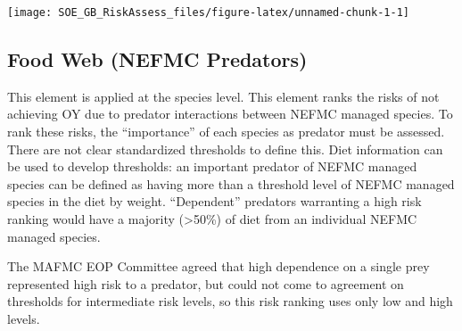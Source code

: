 \documentclass[11pt,]{article}
\let\origfigure\figure
\let\endorigfigure\endfigure
\renewenvironment{figure}[1][2] {
    \expandafter\origfigure\expandafter[H]
} {
    \endorigfigure
}
\begin{document}
\begin{figure}

{\centering \texttt{[image: SOE\_GB\_RiskAssess\_files/figure-latex/unnamed-chunk-1-1]} 

}

\caption{Summary of single species status for NEFMC stocks \label{KOBE}}\label{fig:unnamed-chunk-1}
\end{figure}

\subsection{Food Web (NEFMC Predators)}\label{food-web-nefmc-predators}

This element is applied at the species level. This element ranks the
risks of not achieving OY due to predator interactions between NEFMC
managed species. To rank these risks, the ``importance'' of each species
as predator must be assessed. There are not clear standardized
thresholds to define this. Diet information can be used to develop
thresholds: an important predator of NEFMC managed species can be
defined as having more than a threshold level of NEFMC managed species
in the diet by weight. ``Dependent'' predators warranting a high risk
ranking would have a majority (\textgreater{}50\%) of diet from an
individual NEFMC managed species.

The MAFMC EOP Committee agreed that high dependence on a single prey
represented high risk to a predator, but could not come to agreement on
thresholds for intermediate risk levels, so this risk ranking uses only
low and high levels.
\end{document}

